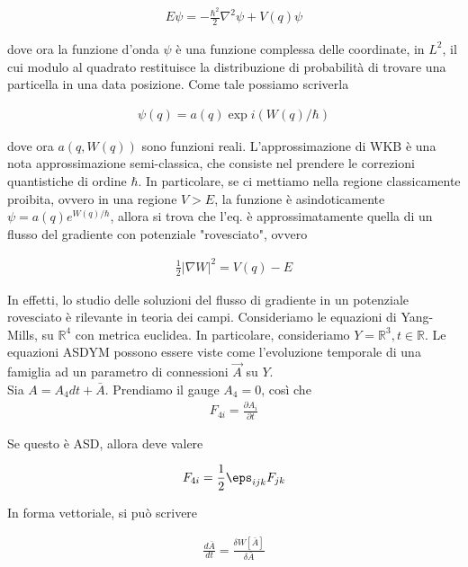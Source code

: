 \documentclass{report}
\begin{document}
\begin{align}
    E \psi = -\frac{\hbar^2}{2}\nabla^2\psi + V(q)\psi
\end{align}

dove ora la funzione d'onda \(\psi\) è una funzione complessa delle coordinate, in \(L^2\), il cui modulo al quadrato restituisce la distribuzione di probabilità di trovare una particella in una data posizione. Come tale possiamo scriverla 

\begin{align}
    \psi(q) = a(q)\exp{i\left(W(q)/\hbar \right)}
\end{align}

dove ora \(a(q, W(q))\) sono funzioni reali. L'approssimazione di WKB è una nota approssimazione semi-classica, che consiste nel prendere le correzioni quantistiche di ordine \(\hbar\). In particolare, se ci mettiamo nella regione classicamente proibita, ovvero in una regione \(V > E\), la funzione è asindoticamente \(\psi = a(q)e^{W(q)/\hbar}\), allora si trova che l'eq. è approssimatamente quella di un flusso del gradiente con potenziale "rovesciato", ovvero 

\begin{align}
    \frac{1}{2}|\nabla W|^2 = V(q) - E
\end{align}

In effetti, lo studio delle soluzioni del flusso di gradiente in un potenziale rovesciato è rilevante in teoria dei campi. Consideriamo le equazioni di Yang-Mills, su \(\mathbb{R}^4\) con metrica euclidea. In particolare, consideriamo \(Y = \mathbb{R}^3, t \in \mathbb{R}\). Le equazioni ASDYM possono essere viste come l'evoluzione temporale di una famiglia ad un parametro di connessioni \(\vec{A}\) su \(Y\).\\

Sia \(A = A_4dt + \bar{A}\). Prendiamo il gauge \(A_4= 0\), così che 
\begin{align}
    F_{4i} = \frac{\partial A_i}{\partial t}
\end{align}

Se questo è ASD, allora deve valere 

\begin{align}
    F_{4i} = \frac{1}{2}\eps_{ijk}F_{jk}
\end{align}

In forma vettoriale, si può scrivere 

\begin{align}
    \frac{d\bar{A}}{dt} = \frac{\delta W[\bar{A}]}{\delta \bar{A}}
\end{align}
\end{document}
